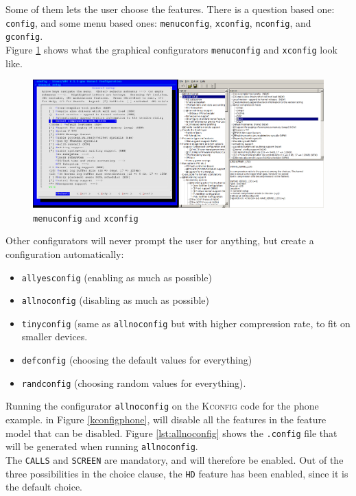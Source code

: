 \documentclass[a4paper,11pt]{report}
\newcommand{\figa}{
    \begin{figure}[!htpb]
    \centering
}
\newcommand{\figb}[2]{
    \caption{#1}
    \label{#2}
    \end{figure}
}
\begin{document}
Some of them lets the user choose the features. There is a question based 
one: \texttt{config}, and some menu based ones: \texttt{menuconfig}, 
\texttt{xconfig}, \texttt{nconfig}, and \texttt{gconfig}.
\\

Figure \ref{fig:lineofconfigs} shows what the graphical 
configurators \texttt{menuconfig} and 
\texttt{xconfig} look like.
\\


\figa
    \includegraphics[scale=0.25]{pngs/2configs.png}
\figb{\texttt{menuconfig} and \texttt{xconfig}}{fig:lineofconfigs}

Other configurators will 
never prompt the user for anything, but create a configuration automatically: 
\begin{itemize}
    \item \texttt{allyesconfig} (enabling as much as possible) 
    \item \texttt{allnoconfig} (disabling as much as possible)
    \item \texttt{tinyconfig} (same as \texttt{allnoconfig} but with higher 
    compression rate, to fit on smaller devices.
    \item \texttt{defconfig} (choosing the default values for everything)
    \item \texttt{randconfig} (choosing random values for everything).
\end{itemize}



Running the configurator \texttt{allnoconfig} on the \textsc{Kconfig} code for 
the phone example. in Figure \ref{kconfigphone}, will disable all the features 
in the feature model that can be disabled. Figure \ref{lst:allnoconfig} shows 
the \texttt{.config} file that will be generated when running 
\texttt{allnoconfig}.
\\

The \texttt{CALLS} and \texttt{SCREEN} are mandatory, and will 
therefore be enabled. Out of the three possibilities in the choice clause, the 
\texttt{HD} feature has been enabled, since it is the default choice.
\end{document}
